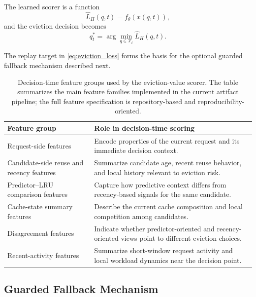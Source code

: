 \documentclass[preprint,12pt]{elsarticle}
\begin{document}
The learned scorer is a function
\begin{equation}
\widehat{L}_H(q,t) = f_{\theta}\!\left(x(q,t)\right),
\label{eq:predicted_loss}
\end{equation}
and the eviction decision becomes
\begin{equation}
q_t^{*} = \arg\min_{q \in \mathcal{V}_t} \widehat{L}_H(q,t).
\label{eq:eviction_rule}
\end{equation}

The replay target in \eqref{eq:eviction_loss} forms the basis for the optional guarded fallback mechanism described next.

\begin{table}[!htbp]
\centering
\caption{Decision-time feature groups used by the eviction-value scorer. The table summarizes the main feature families implemented in the current artifact pipeline; the full feature specification is repository-based and reproducibility-oriented.}
\label{tab:evict-value-feature-groups}
\small
\begin{tabular}{p{3.3cm} p{9.6cm}}
\toprule
Feature group & Role in decision-time scoring \\
\midrule
Request-side features & Encode properties of the current request and its immediate decision context. \\
Candidate-side reuse and recency features & Summarize candidate age, recent reuse behavior, and local history relevant to eviction risk. \\
Predictor--LRU comparison features & Capture how predictive context differs from recency-based signals for the same candidate. \\
Cache-state summary features & Describe the current cache composition and local competition among candidates. \\
Disagreement features & Indicate whether predictor-oriented and recency-oriented views point to different eviction choices. \\
Recent-activity features & Summarize short-window request activity and local workload dynamics near the decision point. \\
\bottomrule
\end{tabular}
\end{table}

\subsection{Guarded Fallback Mechanism}
\label{subsec:guarded_fallback_mechanism}
\end{document}

